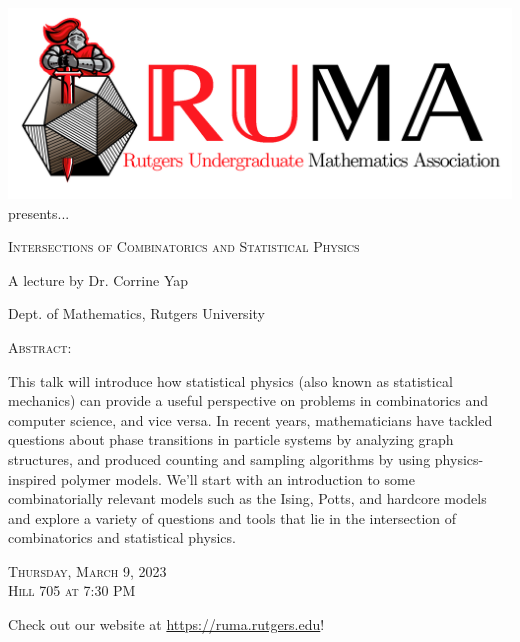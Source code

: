 \documentclass[12pt]{article}
\begin{document}

\begin{center}\includegraphics[scale=.3]{RUMAlogo.png}\\
\large  presents... \\

\vspace{1mm}
\begin{spacing}{1.5}
{\fontsize{28}{18}\selectfont  \textsc{
    Intersections of Combinatorics and Statistical Physics 
    }} \end{spacing}
 
\begin{spacing}{1.1}
{\fontsize{20}{18} \selectfont A lecture by Dr. Corrine Yap} 
\end{spacing} 
\large Dept. of Mathematics, Rutgers University

\normalsize

\vspace{5mm}

\textsc{Abstract:}



\Large
This talk will introduce how statistical physics (also known as statistical mechanics) can provide a useful perspective on problems in combinatorics and computer science, and vice versa. In recent years, mathematicians have tackled questions about phase transitions in particle systems by analyzing graph structures, and produced counting and sampling algorithms by using physics-inspired polymer models. We'll start with an introduction to some combinatorially relevant models such as the Ising, Potts, and hardcore models and explore a variety of questions and tools that lie in the intersection of combinatorics and statistical physics.




\begin{spacing}{1.5}
    {\fontsize{24}{28}\selectfont  \textsc{
        Thursday, March 9, 2023 \\ Hill 705 at 7:30 PM}
    } 
\end{spacing}

\Large  Check out our website at 
\url{https://ruma.rutgers.edu}!
\end{center}
\end{document}
